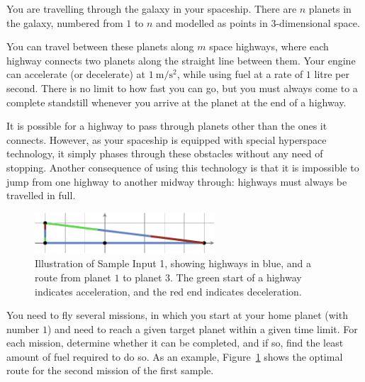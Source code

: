 

\newcommand{\maxn}{10^5}
\newcommand{\maxc}{10^3}

You are travelling through the galaxy in your spaceship.
There are $n$ planets in the galaxy, numbered from $1$ to $n$ and modelled as points in $3$-dimensional space.

You can travel between these planets along $m$ space highways, where each highway connects two planets along the straight line between them.
Your engine can accelerate (or decelerate) at $\SI{1}{\metre\per\second\squared}$, while using fuel at a rate of $1$ litre per second.
There is no limit to how fast you can go, but you must always come to a complete
standstill whenever you arrive at the planet at the end of a highway.

It is possible for a highway to pass through planets other than the ones it connects.
However, as your spaceship is equipped with special hyperspace technology, it simply phases through these obstacles without any need of stopping.
Another consequence of using this technology is that it is impossible to jump from one highway to another midway through: highways must always be travelled in full.

\begin{figure}[!h]
  \centering
  \includegraphics[width=0.6\textwidth]{sample1.pdf}
  \caption{Illustration of Sample Input 1, showing highways in blue, and a
    route from planet $1$ to planet $3$.
    The green start of a highway indicates acceleration,
    and the red end indicates deceleration.}
  \label{fig:galaxy}
\end{figure}

You need to fly several missions, in which you start at your home planet (with number $1$) and need to reach a given target planet within a given time limit.
For each mission, determine whether it can be completed, and if so, find the
least amount of fuel required to do so.
As an example, Figure~\ref{fig:galaxy} shows the optimal route for the second mission of the first sample.

